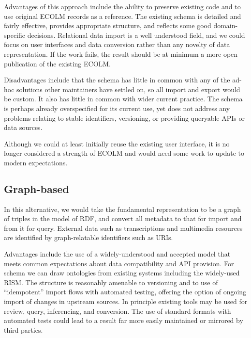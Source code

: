 \documentclass[sigconf, nonacm=true]{acmart}
\begin{document}
\begin{sloppypar}
  Advantages of this approach include the ability to preserve existing
  code and to use original ECOLM records as a reference. The existing
  schema is detailed and fairly effective, provides appropriate
  structure, and reflects some good domain-specific
  decisions. Relational data import is a well understood field, and we
  could focus on user interfaces and data conversion rather than any
  novelty of data representation. If the work fails, the result should
  be at minimum a more open publication of the existing ECOLM.

  Disadvantages include that the schema has little in common with any
  of the ad-hoc solutions other maintainers have settled on, so all
  import and export would be custom. It also has little in common with
  wider current practice. The schema is perhaps already overspecified
  for its current use, yet does not address any problems relating to
  stable identifiers, versioning, or providing queryable APIs or data
  sources.

  Although we could at least initially reuse the existing user
  interface, it is no longer considered a strength of ECOLM and would
  need some work to update to modern expectations.

  \subsection{Graph-based}

  In this alternative, we would take the fundamental representation to
  be a graph of triples in the model of RDF, and convert all metadata
  to that for import and from it for query. External data such as
  transcriptions and multimedia resources are identified by
  graph-relatable identifiers such as URIs.

  Advantages include the use of a widely-understood and accepted model
  that meets common expectations about data compatibility and API
  provision. For schema we can draw ontologies from existing systems
  including the widely-used RISM. The structure is reasonably amenable
  to versioning and to use of ``idempotent'' import flows with
  automated testing, offering the option of ongoing import of changes
  in upstream sources. In principle existing tools may be used for
  review, query, inferencing, and conversion. The use of standard
  formats with automated tests could lead to a result far more easily
  maintained or mirrored by third parties.


\end{sloppypar}
\end{document}
